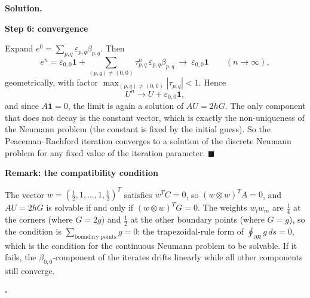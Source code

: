 \documentclass[11pt,a4paper]{article}
\newenvironment{solution}
  {\par\noindent\textbf{Solution.}\par\nobreak}
  {\par\hfill\(\square\)\par}
\newcommand{\step}[1]{\par\addvspace{0.5em}\noindent\textbf{#1}\par\nobreak}
\begin{document}
\begin{solution}
\step{Step 6: convergence}
Expand \(e^0=\sum_{p,q}\varepsilon_{p,q}\beta_{p,q}\).  Then
\[
  e^n=\varepsilon_{0,0}\mathbf 1+\sum_{(p,q)\ne(0,0)}\tau_{p,q}^n\,\varepsilon_{p,q}\beta_{p,q}
  \ \longrightarrow\ \varepsilon_{0,0}\mathbf 1\qquad(n\to\infty),
\]
geometrically, with factor \(\max_{(p,q)\ne(0,0)}|\tau_{p,q}|<1\).
Hence
\[
  U^n\to U+\varepsilon_{0,0}\mathbf 1,
\]
and since \(A\mathbf 1=0\), the limit is again a solution of
\(AU=2hG\).  The only component that does not decay is the constant
vector, which is exactly the non-uniqueness of the Neumann problem
(the constant is fixed by the initial guess).  So the
Peaceman--Rachford iteration converges to a solution of the discrete
Neumann problem for any fixed value of the iteration parameter.
\(\blacksquare\)

\step{Remark: the compatibility condition}
The vector \(w=(\frac12,1,\dots,1,\frac12)^T\) satisfies \(w^TC=0\), so
\((w\otimes w)^TA=0\), and \(AU=2hG\) is solvable if and only if
\((w\otimes w)^TG=0\).  The weights \(w_lw_m\) are \(\frac14\) at the
corners (where \(G=2g\)) and \(\frac12\) at the other boundary points
(where \(G=g\)), so the condition is \(\sum_{\text{boundary points}}g=0\):
the trapezoidal-rule form of \(\oint_{\partial R}g\,ds=0\), which is the
condition for the continuous Neumann problem to be solvable.  If it
fails, the \(\beta_{0,0}\)-component of the iterates drifts linearly
while all other components still converge.
\end{solution}
\end{document}
